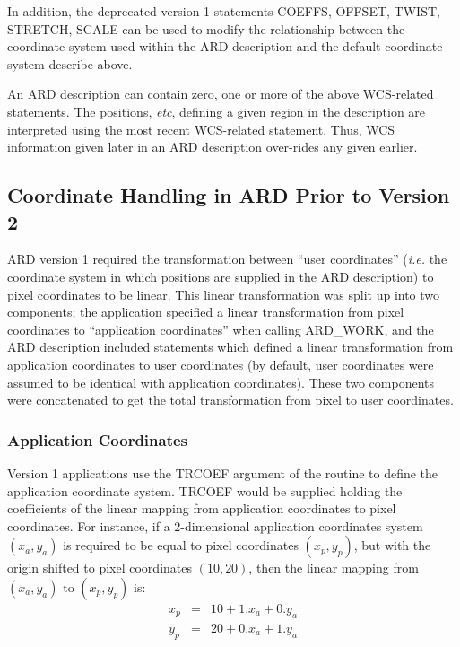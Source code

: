 \begin{enumerate}
In addition, the deprecated version 1 statements COEFFS, OFFSET, TWIST,
STRETCH, SCALE can be used to modify the relationship between the
coordinate system used within the ARD description and the default
coordinate system describe above.

\end{enumerate}

An ARD description can contain zero, one or more of the above WCS-related 
statements. The positions, {\em etc}, defining a given region in the
description are interpreted using the most recent WCS-related statement.
Thus, WCS information given later in an ARD description over-rides any
given earlier.

\subsection{Coordinate Handling in ARD Prior to Version 2}

ARD version 1 required the transformation between ``user coordinates''
({\em i.e.} the coordinate system in which positions are supplied in the
ARD description) to pixel coordinates to be linear. This linear
transformation was split up into two components; the application specified
a linear transformation from pixel coordinates to ``application
coordinates'' when calling ARD\_WORK, and the ARD description included
statements which defined a linear transformation from application
coordinates to user coordinates (by default, user coordinates were
assumed to be identical with application coordinates). These two
components were concatenated to get the total transformation from pixel
to user coordinates.

\subsubsection{Application Coordinates}
Version 1 applications use the TRCOEF argument of the  
routine to define the application coordinate system. TRCOEF would be supplied 
holding the
coefficients of the linear mapping from application coordinates to pixel
coordinates. For instance, if a 2-dimensional application coordinates system
$(x_{a},y_{a})$ is required to be equal to pixel coordinates $(x_{p},y_{p})$,
but with the origin shifted to pixel coordinates $(10,20)$, then the linear
mapping from $(x_{a},y_{a})$ to $(x_{p},y_{p})$ is:
\small
\begin{eqnarray*}
x_{p} & = & 10 + 1.x_{a} + 0.y_{a} \\
y_{p} & = & 20 + 0.x_{a} + 1.y_{a} 
\end{eqnarray*}
\normalsize

